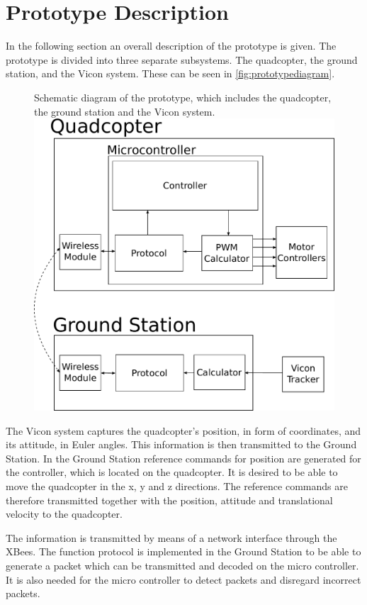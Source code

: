\section{Prototype Description}\label{sec:PrototypeDescription}
In the following section an overall description of the prototype is given. %
The prototype is divided into three separate subsystems. The quadcopter, the ground station, and the Vicon system. These can be seen in \autoref{fig:prototypediagram}. 

\begin{figure}[H]
  \centering
  \captionbox
  {
    Schematic diagram of the prototype, which includes the quadcopter, the ground station and the Vicon system.
    \label{fig:prototypediagram}
  }
  {
    \includegraphics[width=.5\textwidth]{figures/prototypediagram}
  }
\end{figure}
The Vicon system captures the quadcopter's position, in form of coordinates, and its attitude, in Euler angles. This information is then transmitted to the Ground Station. In the Ground Station reference commands for position are generated for the controller, which is located on the quadcopter. It is desired to be able to move the quadcopter in the x, y and z directions. The reference commands are therefore transmitted together with the position, attitude and translational velocity to the quadcopter.

The information is transmitted by means of a network interface through the XBees. The function protocol is implemented in the Ground Station to be able to generate a packet which can be transmitted and decoded on the micro controller. It is also needed for the micro controller to detect packets and disregard incorrect packets.

